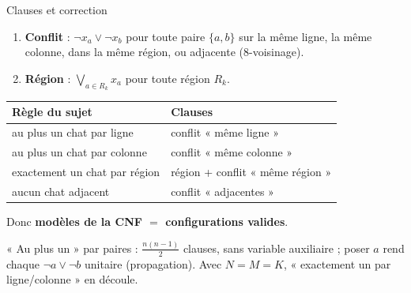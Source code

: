 \documentclass[aspectratio=169,11pt]{beamer}
\begin{document}
\begin{frame}{Clauses et correction}
  \begin{enumerate}
    \item \textbf{Conflit} : $\neg x_a \lor \neg x_b$ pour toute paire $\{a,b\}$ sur la même ligne, la même colonne,
      dans la même région, ou adjacente (8-voisinage).
    \item \textbf{Région} : $\bigvee_{a \in R_k} x_a$ pour toute région $R_k$.
  \end{enumerate}
  \medskip
  \begin{center}\small
  \begin{tabular}{ll}
    \toprule
    Règle du sujet & Clauses \\
    \midrule
    au plus un chat par ligne & conflit « même ligne » \\
    au plus un chat par colonne & conflit « même colonne » \\
    exactement un chat par région & région + conflit « même région » \\
    aucun chat adjacent & conflit « adjacentes » \\
    \bottomrule
  \end{tabular}
  \end{center}
  Donc \textbf{modèles de la CNF $=$ configurations valides}.
  \medskip

  {\footnotesize « Au plus un » par paires : $\frac{n(n-1)}{2}$ clauses, sans variable auxiliaire ;
  poser $a$ rend chaque $\neg a \lor \neg b$ unitaire (propagation).
  Avec $N = M = K$, « exactement un par ligne/colonne » en découle.\par}
\end{frame}
\end{document}

